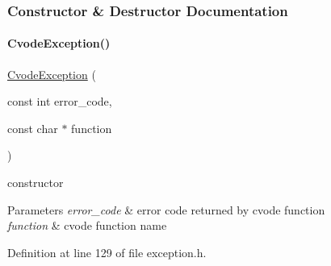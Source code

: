 \subsubsection{Constructor \& Destructor Documentation}
\mbox{\label{classamici_1_1_cvode_exception_ac93a5dc0529238779b716b7a30cf69cb}} 
\paragraph{\texorpdfstring{CvodeException()}{CvodeException()}}
{\footnotesize\ttfamily \mbox{\hyperlink{classamici_1_1_cvode_exception}{Cvode\+Exception}} (\begin{DoxyParamCaption}\item[{const int}]{error\+\_\+code,  }\item[{const char $\ast$}]{function }\end{DoxyParamCaption})}

constructor 
\begin{DoxyParams}{Parameters}
{\em error\+\_\+code} & error code returned by cvode function \\
\hline
{\em function} & cvode function name \\
\hline
\end{DoxyParams}


Definition at line 129 of file exception.\+h.

